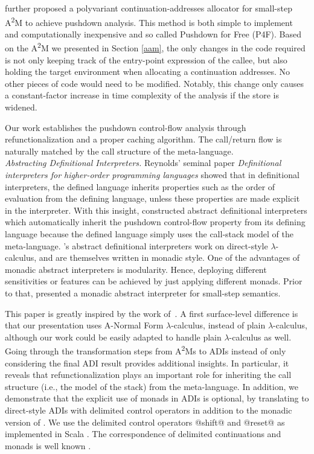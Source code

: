 \documentclass[acmsmall, screen]{acmart}\settopmatter{}
\begin{document}
 further proposed a polyvariant continuation-addresses allocator
for small-step A\textsuperscript{2}M to achieve pushdown analysis. This method is both
simple to implement and computationally inexpensive and so called Pushdown for Free (P4F).
Based on the A\textsuperscript{2}M we presented in Section \ref{aam}, the only changes in the code required is not
only keeping track of the entry-point expression of the callee, but also holding the target
environment when allocating a continuation addresses. No other pieces of code would need to be
modified. Notably, this change only causes a constant-factor increase in time complexity of
the analysis if the store is widened.

Our work establishes the pushdown control-flow analysis through refunctionalization and a
proper caching algorithm. The call/return flow is naturally matched by the call structure
of the meta-language. \\

\textit{Abstracting Definitional Interpreters.}
Reynolds' seminal paper \emph{Definitional interpreters for higher-order programming languages}
\cite{Reynolds:72, Reynolds:HOSC98-revisited} showed that in definitional interpreters, the
defined language inherits properties such as the order of evaluation from the defining
language, unless these properties are made explicit in the
interpreter. With this insight,
\citet{darais2017abstracting} constructed abstract definitional interpreters which
automatically inherit the pushdown control-flow property from its defining language because
the defined language simply uses the call-stack model of the meta-language.
\citeauthor{darais2017abstracting}'s abstract definitional interpreters work on direct-style
$\lambda$-calculus, and are themselves written in monadic style. One of the advantages of monadic
abstract interpreters is modularity. Hence, deploying different sensitivities
or features can be achieved by just applying different monads. Prior to that, \citet{Sergey:2013:MAI:2491956.2491979}
presented a monadic abstract interpreter for small-step semantics.

This paper is greatly inspired by the work of~\citet{darais2017abstracting}.
A first surface-level difference is that our presentation uses A-Normal Form $\lambda$-calculus,
instead of plain $\lambda$-calculus, although our work could be easily adapted to handle plain
$\lambda$-calculus as well. Going through the transformation steps from A\textsuperscript{2}Ms to ADIs instead of
only considering the final ADI result provides additional insights. In particular, it reveals that
refunctionalization plays an important role for inheriting the call structure (i.e., the model of
the stack) from the meta-language.
In addition, we demonstrate that the explicit use of monads in ADIs is optional, by translating to
direct-style ADIs with delimited control operators in addition to the monadic version of \citet{darais2017abstracting}.
We use the delimited control operators @shift@ and @reset@ \cite{Danvy:1990:AC:91556.91622} as implemented in Scala
\cite{rompf2009implementing}. The correspondence of delimited continuations and monads is well known
\cite{Danvy:1990:AC:91556.91622, wadler1992essence, danvy1992representing, moggi1991notions, filinski1994representing}.
\end{document}
